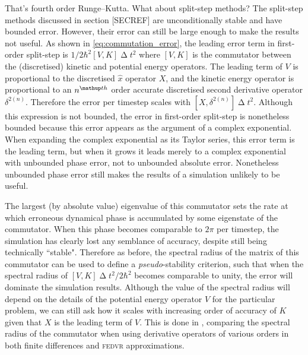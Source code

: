 That's fourth order Runge--Kutta. What about split-step methods? The split-step methods discussed in section [SECREF] are unconditionally stable and have bounded error. However, their error can still be large enough to make the results not useful. As shown in \eqref{eq:commutation_error}, the leading error term in first-order split-step is $1/2\hbar^2[V, K]\upDelta t^2$ where $[V, K]$ is the commutator between the (discretised) kinetic and potential energy operators. The leading term of $V$ is proportional to the discretised $\hat x$ operator $X$, and the kinetic energy operator is proportional to an $n^\up{th}$ order accurate discretised second derivative operator $\delta^{2 (n)}$. Therefore the error per timestep scales with $[X, \delta^{2 (n)}]\upDelta t^2$. Although this expression is not bounded, the error in first-order split-step is nonetheless bounded because this error appears as the argument of a complex exponential. When expanding the complex exponential as its Taylor series, this error term is the leading term, but when it grows it leads merely to a complex exponential with unbounded phase error, not to unbounded absolute error. Nonetheless unbounded phase error still makes the results of a simulation unlikely to be useful.

The largest (by absolute value) eigenvalue of this commutator sets the rate at which erroneous dynamical phase is accumulated by some eigenstate of the commutator. When this phase becomes comparable to $2\pi$ per timestep, the simulation has clearly lost any semblance of accuracy, despite still being technically ``stable". Therefore as before, the spectral radius of the matrix of this commutator can be used to define a \emph{pseudo}-stability criterion, such that when the spectral radius of $[V, K]\upDelta t^2/2\hbar^2$ becomes comparable to unity, the error will dominate the simulation results. Although the value of the spectral radius will depend on the details of the potential energy operator $V$ for the particular problem, we can still ask how it scales with increasing order of accuracy of $K$ given that $X$ is the leading term of $V$. This is done in , comparing the spectral radius of the commutator when using derivative operators of various orders in both finite differences and \textsc{fedvr} approximations.

